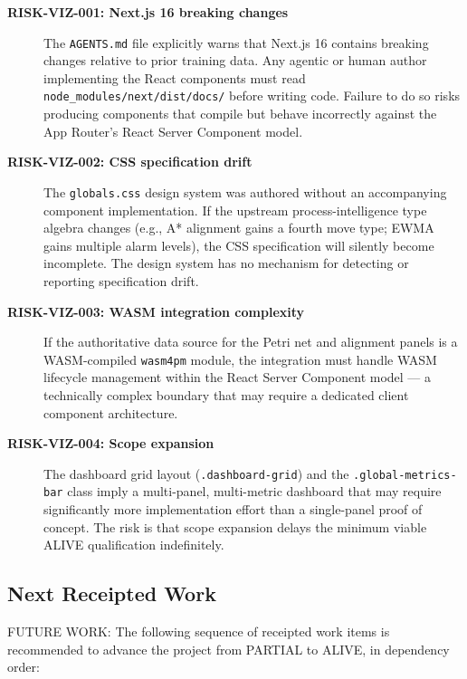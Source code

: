 \begin{description}
  \item[\textbf{RISK-VIZ-001: Next.js 16 breaking changes}]
    The \texttt{AGENTS.md} file explicitly warns that Next.js 16 contains breaking changes
    relative to prior training data. Any agentic or human author implementing the React
    components must read \texttt{node\_modules/next/dist/docs/} before writing code.
    Failure to do so risks producing components that compile but behave incorrectly
    against the App Router's React Server Component model.

  \item[\textbf{RISK-VIZ-002: CSS specification drift}]
    The \texttt{globals.css} design system was authored without an accompanying component
    implementation. If the upstream process-intelligence type algebra changes (e.g., A{*}
    alignment gains a fourth move type; EWMA gains multiple alarm levels), the CSS
    specification will silently become incomplete. The design system has no mechanism for
    detecting or reporting specification drift.

  \item[\textbf{RISK-VIZ-003: WASM integration complexity}]
    If the authoritative data source for the Petri net and alignment panels is a WASM-compiled
    \texttt{wasm4pm} module, the integration must handle WASM lifecycle management within
    the React Server Component model --- a technically complex boundary that may require
    a dedicated client component architecture.

  \item[\textbf{RISK-VIZ-004: Scope expansion}]
    The dashboard grid layout (\texttt{.dashboard-grid}) and the \texttt{.global-metrics-bar}
    class imply a multi-panel, multi-metric dashboard that may require significantly more
    implementation effort than a single-panel proof of concept. The risk is that scope
    expansion delays the minimum viable ALIVE qualification indefinitely.
\end{description}

\subsection{Next Receipted Work}
\label{sec:experiments-visualizer-nextjs-open-next}

FUTURE WORK: The following sequence of receipted work items is recommended to advance the
project from PARTIAL to ALIVE, in dependency order:

